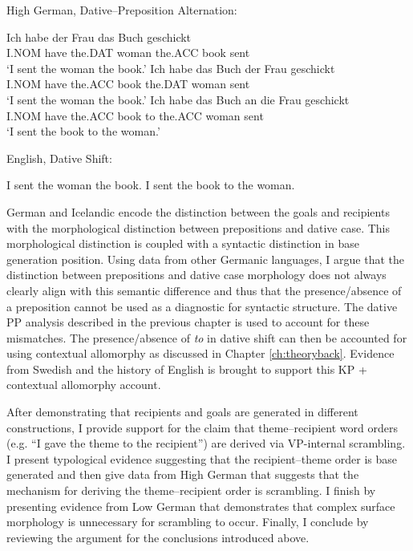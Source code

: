 \begin{exe}
	\ex High German, Dative--Preposition Alternation: \label{ex:german-forms}
	\begin{xlist}
		 \ex \label{ex:german-1} \gll Ich habe der Frau das Buch geschickt\\
		 	 I.NOM have the.DAT woman the.ACC book sent\\
			 \trans `I sent the woman the book.'
		 \ex \label{ex:german-2} \gll Ich habe das Buch der Frau geschickt\\
			 I.NOM have the.ACC book the.DAT woman sent\\
			 \trans `I sent the woman the book.'
		 \ex \label{ex:german-3} \gll Ich habe das Buch an die Frau geschickt\\
			 I.NOM have the.ACC book to the.ACC woman sent\\
			 \trans `I sent the book to the woman.'
	\end{xlist}
	 English, Dative Shift:
	\begin{xlist}
		 I sent the woman the book.
		 I sent the book to the woman.
	\end{xlist}
\end{exe}

German and Icelandic encode the distinction between the goals and recipients with the morphological distinction between prepositions and dative case. This morphological distinction is coupled with a syntactic distinction in base generation position. Using data from other Germanic languages, I argue that the distinction between prepositions and dative case morphology does not always clearly align with this semantic difference and thus that the presence/absence of a preposition cannot be used as a diagnostic for syntactic structure. The dative PP analysis described in the previous chapter is used to account for these mismatches. The presence/absence of \textit{to} in dative shift can then be accounted for using contextual allomorphy as discussed in Chapter \ref{ch:theoryback}. Evidence from Swedish and the history of English is brought to support this KP + contextual allomorphy account.

After demonstrating that recipients and goals are generated in different constructions, I provide support for the claim that theme--recipient word orders (e.g. ``I gave the theme to the recipient'') are derived via VP-internal scrambling. I present typological evidence suggesting that the recipient--theme order is base generated and then give data from High German that suggests that the mechanism for deriving the theme--recipient order is scrambling. I finish by presenting evidence from Low German that demonstrates that complex surface morphology is unnecessary for scrambling to occur. Finally, I conclude by reviewing the argument for the conclusions introduced above.

